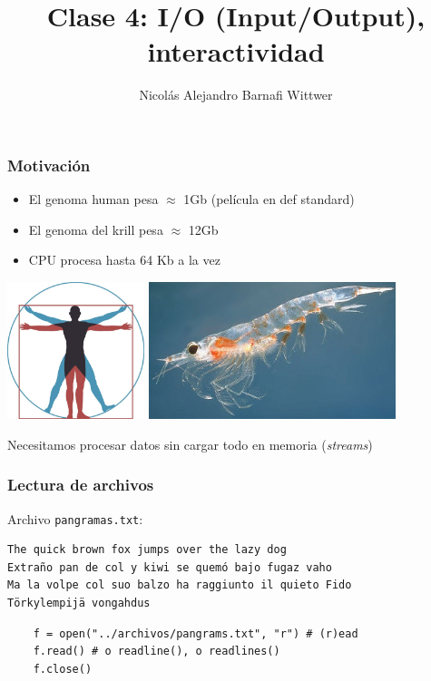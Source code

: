 \documentclass[14pt,aspectratio=169,xcolor=dvipsnames]{beamer}
\title[short title]{Clase 4: I/O (Input/Output), interactividad}
\subtitle{}
\author[NA Barnafi] {Nicolás Alejandro Barnafi Wittwer}
\institute[UC|CMM] 
{
    Pontificia Universidad Católica de Chile \\
    Centro de Modelamiento Matemático
}
\date{}
\begin{document}
\begin{frame}
    \maketitle
\end{frame}
\begin{frame}\frametitle{Motivación}
    \begin{itemize}
        \item El genoma human pesa $\approx$ 1Gb (película en def standard)
        \item El genoma del krill pesa $\approx$ 12Gb
        \item CPU procesa hasta 64 Kb a la vez
    \end{itemize}
    \hspace{2cm}\includegraphics[height=4cm]{../images/vitruvio.jpg}
    \includegraphics[height=4cm]{../images/krill.jpg}

\pause Necesitamos procesar datos sin cargar todo en memoria (\emph{streams})
\end{frame}
\begin{frame}[fragile]\frametitle{Lectura de archivos}
Archivo \texttt{pangramas.txt}:
    \begin{verbatim}
The quick brown fox jumps over the lazy dog
Extraño pan de col y kiwi se quemó bajo fugaz vaho
Ma la volpe col suo balzo ha raggiunto il quieto Fido
Törkylempijä vongahdus
    \end{verbatim}

    \begin{verbatim}
    f = open("../archivos/pangrams.txt", "r") # (r)ead
    f.read() # o readline(), o readlines()
    f.close()
    \end{verbatim}
\end{frame}
\end{document}
